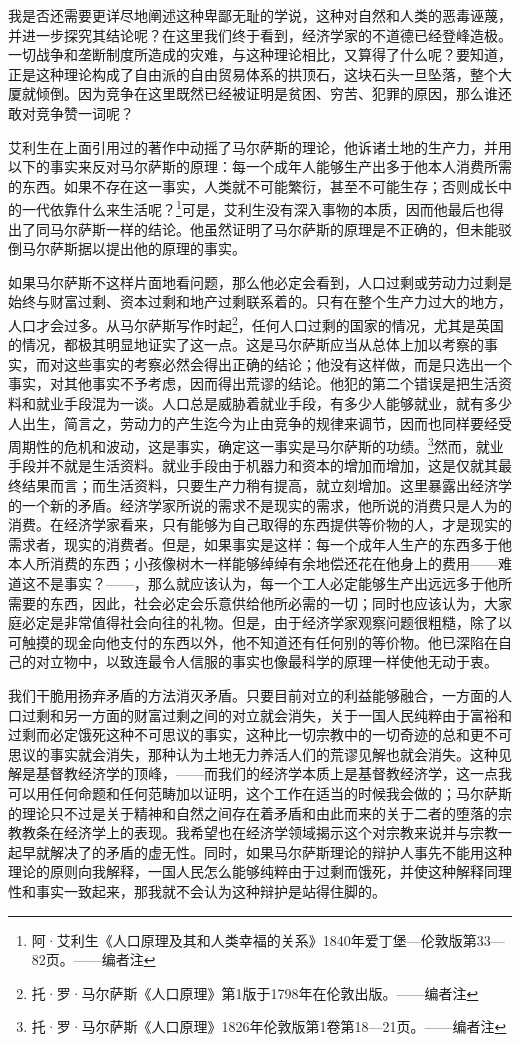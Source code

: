 \documentclass[a4paper,twoside,12pt,AutoFakeBold]{ctexart}
\begin{document}
我是否还需要更详尽地阐述这种卑鄙无耻的学说，这种对自然和人类的恶毒诬蔑，并进一步探究其结论呢？在这里我们终于看到，经济学家的不道德已经登峰造极。一切战争和垄断制度所造成的灾难，与这种理论相比，又算得了什么呢？要知道，正是这种理论构成了自由派的自由贸易体系的拱顶石，这块石头一旦坠落，整个大厦就倾倒。因为竞争在这里既然已经被证明是贫困、穷苦、犯罪的原因，那么谁还敢对竞争赞一词呢？

艾利生在上面引用过的著作中动摇了马尔萨斯的理论，他诉诸土地的生产力，并用以下的事实来反对马尔萨斯的原理：每一个成年人能够生产出多于他本人消费所需的东西。如果不存在这一事实，人类就不可能繁衍，甚至不可能生存；否则成长中的一代依靠什么来生活呢？\footnote{阿·艾利生《人口原理及其和人类幸福的关系》1840年爱丁堡—伦敦版第33—82页。——编者注}可是，艾利生没有深入事物的本质，因而他最后也得出了同马尔萨斯一样的结论。他虽然证明了马尔萨斯的原理是不正确的，但未能驳倒马尔萨斯据以提出他的原理的事实。

如果马尔萨斯不这样片面地看问题，那么他必定会看到，人口过剩或劳动力过剩是始终与财富过剩、资本过剩和地产过剩联系着的。只有在整个生产力过大的地方，人口才会过多。从马尔萨斯写作时起\footnote{托·罗·马尔萨斯《人口原理》第1版于1798年在伦敦出版。——编者注}，任何人口过剩的国家的情况，尤其是英国的情况，都极其明显地证实了这一点。这是马尔萨斯应当从总体上加以考察的事实，而对这些事实的考察必然会得出正确的结论；他没有这样做，而是只选出一个事实，对其他事实不予考虑，因而得出荒谬的结论。他犯的第二个错误是把生活资料和就业手段混为一谈。人口总是威胁着就业手段，有多少人能够就业，就有多少人出生，简言之，劳动力的产生迄今为止由竞争的规律来调节，因而也同样要经受周期性的危机和波动，这是事实，确定这一事实是马尔萨斯的功绩。\footnote{托·罗·马尔萨斯《人口原理》1826年伦敦版第1卷第18—21页。——编者注}然而，就业手段并不就是生活资料。就业手段由于机器力和资本的增加而增加，这是仅就其最终结果而言；而生活资料，只要生产力稍有提高，就立刻增加。这里暴露出经济学的一个新的矛盾。经济学家所说的需求不是现实的需求，他所说的消费只是人为的消费。在经济学家看来，只有能够为自己取得的东西提供等价物的人，才是现实的需求者，现实的消费者。但是，如果事实是这样：每一个成年人生产的东西多于他本人所消费的东西；小孩像树木一样能够绰绰有余地偿还花在他身上的费用——难道这不是事实？——，那么就应该认为，每一个工人必定能够生产出远远多于他所需要的东西，因此，社会必定会乐意供给他所必需的一切；同时也应该认为，大家庭必定是非常值得社会向往的礼物。但是，由于经济学家观察问题很粗糙，除了以可触摸的现金向他支付的东西以外，他不知道还有任何别的等价物。他已深陷在自己的对立物中，以致连最令人信服的事实也像最科学的原理一样使他无动于衷。

我们干脆用扬弃矛盾的方法消灭矛盾。只要目前对立的利益能够融合，一方面的人口过剩和另一方面的财富过剩之间的对立就会消失，关于一国人民纯粹由于富裕和过剩而必定饿死这种不可思议的事实，这种比一切宗教中的一切奇迹的总和更不可思议的事实就会消失，那种认为土地无力养活人们的荒谬见解也就会消失。这种见解是基督教经济学的顶峰，——而我们的经济学本质上是基督教经济学，这一点我可以用任何命题和任何范畴加以证明，这个工作在适当的时候我会做的；马尔萨斯的理论只不过是关于精神和自然之间存在着矛盾和由此而来的关于二者的堕落的宗教教条在经济学上的表现。我希望也在经济学领域揭示这个对宗教来说并与宗教一起早就解决了的矛盾的虚无性。同时，如果马尔萨斯理论的辩护人事先不能用这种理论的原则向我解释，一国人民怎么能够纯粹由于过剩而饿死，并使这种解释同理性和事实一致起来，那我就不会认为这种辩护是站得住脚的。
\end{document}
